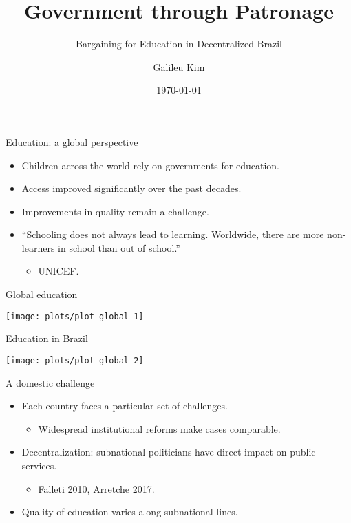 \documentclass[ignorenonframetext,]{beamer}
\date[]{\today}
\title{Government through Patronage}
\subtitle{Bargaining for Education in Decentralized Brazil}
\author{Galileu Kim}
\institute{Princeton University}
\date{}
\providecommand{\tightlist}{%
  \setlength{\itemsep}{0pt}\setlength{\parskip}{0pt}}
\newcommand{\source}{\footnotesize\textcolor{black!25}}
\begin{document}
\frame{\titlepage}

\begin{frame}{Education: a global perspective}
\protect\hypertarget{education-a-global-perspective}{}

\begin{itemize}
\tightlist
\item
  Children across the world rely on governments for education.
\item
  Access improved significantly over the past decades.
\item
  Improvements in quality remain a challenge.
\item
  ``Schooling does not always lead to learning. Worldwide, there are
  more non-learners in school than out of school.''

  \begin{itemize}
  \item
    \source{UNICEF.}
  \end{itemize}
\end{itemize}

\end{frame}

\begin{frame}{Global education}
\protect\hypertarget{global-education}{}

\begin{center}\texttt{[image: plots/plot\_global\_1]} \end{center}

\end{frame}

\begin{frame}{Education in Brazil}
\protect\hypertarget{education-in-brazil}{}

\begin{center}\texttt{[image: plots/plot\_global\_2]} \end{center}

\end{frame}

\begin{frame}{A domestic challenge}
\protect\hypertarget{a-domestic-challenge}{}

\begin{itemize}
\tightlist
\item
  Each country faces a particular set of challenges.

  \begin{itemize}
  \tightlist
  \item
    Widespread institutional reforms make cases comparable.
  \end{itemize}
\item
  Decentralization: subnational politicians have direct impact on public
  services.

  \begin{itemize}
  \item
    \source{Falleti 2010, Arretche 2017.}
  \end{itemize}
\item
  Quality of education varies along subnational lines.
\end{itemize}

\end{frame}
\end{document}
